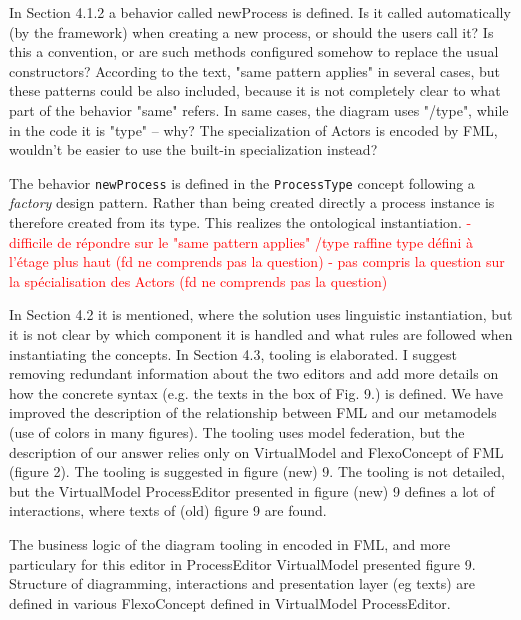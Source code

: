 \documentclass[10pt]{article}
\begin{document}
\begin{response}{In Section 4.1.2 a behavior called newProcess is defined. Is it called automatically (by the framework) when creating a new process, or should the users call it? Is this a convention, or are such methods configured somehow to replace the usual constructors? According to the text, "same pattern applies" in several cases, but these patterns could be also included, because it is not completely clear to what part of the behavior "same" refers. In same cases, the diagram uses "/type", while in the code it is "type" -- why? The specialization of Actors is encoded by FML, wouldn’t be easier to use the built-in specialization instead?} 

{\color{teal}The behavior \texttt{newProcess} is defined in the \texttt{ProcessType} concept following a \emph{factory} design pattern. Rather than being created directly a process instance is therefore created from its type. This realizes the ontological instantiation. }
\textcolor{red}{
- difficile de répondre sur le "same pattern applies" /type raffine type défini à l'étage plus haut (fd ne comprends pas la question)
- pas compris la question sur la spécialisation des Actors (fd ne comprends pas la question)
}

\end{response}


\begin{response}{In Section 4.2 it is mentioned, where the solution uses linguistic instantiation, but it is not clear by which component it is handled and what rules are followed when instantiating the concepts. In Section 4.3, tooling is elaborated. I suggest removing redundant information about the two editors and add more details on how the concrete syntax (e.g. the texts in the box of Fig. 9.) is defined.} 
We have improved the description of the relationship between FML and our metamodels (use of colors in many figures). 
The tooling uses model federation, but the description of our answer relies only on VirtualModel and FlexoConcept of FML (figure 2). The tooling is suggested in figure (new) 9. The tooling is not detailed, but the VirtualModel ProcessEditor presented in figure (new) 9 defines a lot of interactions, where texts of (old) figure 9 are found.  

The business logic of the diagram tooling in encoded in FML, and more particulary for this editor in ProcessEditor VirtualModel presented figure 9. Structure of diagramming, interactions and presentation layer (eg texts) are defined in various FlexoConcept defined in VirtualModel ProcessEditor.

\end{response}
\end{document}
